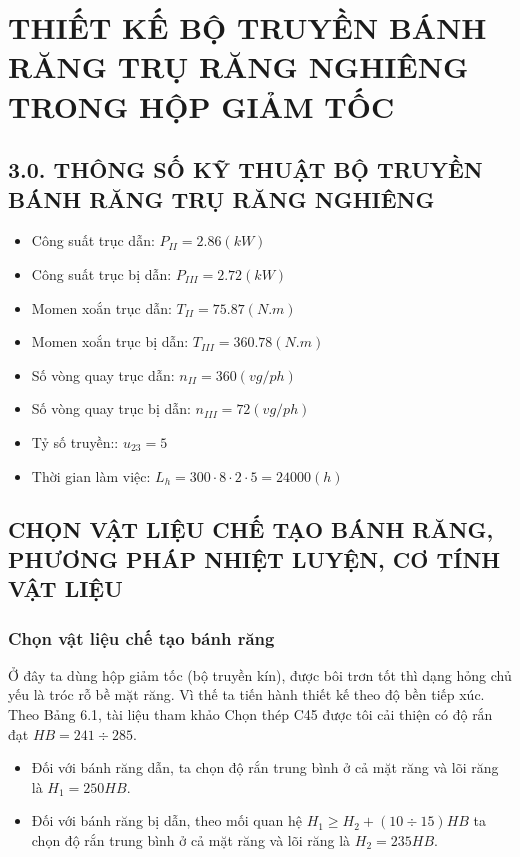 \chapter{THIẾT KẾ BỘ TRUYỀN BÁNH RĂNG TRỤ RĂNG NGHIÊNG TRONG HỘP GIẢM TỐC}
    \section*{3.0. THÔNG SỐ KỸ THUẬT BỘ TRUYỀN BÁNH RĂNG TRỤ RĂNG NGHIÊNG}
        \begin{itemize}
            \item Công suất trục dẫn: $P_{II} = 2.86 (kW)$
            \item Công suất trục bị dẫn: $P_{III} = 2.72 (kW)$
            \item Momen xoắn trục dẫn: $T_{II} = 75.87 (N.m)$
            \item Momen xoắn trục bị dẫn: $T_{III} = 360.78 (N.m)$
            \item Số vòng quay trục dẫn: $n_{II} = 360 (vg/ph)$
            \item Số vòng quay trục bị dẫn: $n_{III} = 72 (vg/ph)$
            \item Tỷ số truyền:: $u_{23} = 5$
            \item Thời gian làm việc: $L_h = 300 \cdot 8 \cdot 2 \cdot 5 = 24000 (h)$
        \end{itemize}
    \section{CHỌN VẬT LIỆU CHẾ TẠO BÁNH RĂNG, PHƯƠNG PHÁP NHIỆT LUYỆN, CƠ TÍNH VẬT LIỆU}
        \subsection{Chọn vật liệu chế tạo bánh răng}
            \hspace*{0.6cm}Ở đây ta dùng hộp giảm tốc (bộ truyền kín), được bôi trơn tốt thì dạng hỏng chủ yếu là tróc rỗ bề mặt răng. Vì thế ta tiến hành thiết kế theo độ bền tiếp xúc. \\
            \hspace*{0.6cm}Theo Bảng 6.1, tài liệu tham khảo \cite{tltk1} Chọn thép C45 được tôi cải thiện có độ rắn đạt $HB = 241 \div 285$. \\
            \begin{itemize}
                \item Đối với bánh răng dẫn, ta chọn độ rắn trung bình ở cả mặt răng và lõi răng là $H_{1} = 250 HB$. 
                \item Đối với bánh răng bị dẫn, theo mối quan hệ $H_1 \geq H_2 + (10 \div 15) HB$ ta chọn độ rắn trung bình ở cả mặt răng và lõi răng là $H_{2} = 235 HB$.
            \end{itemize}
